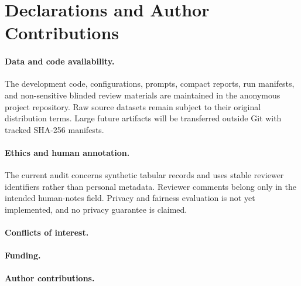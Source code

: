 \section{Declarations and Author Contributions}
\label{sec:declarations}

\paragraph{Data and code availability.}
The development code, configurations, prompts, compact reports, run manifests,
and non-sensitive blinded review materials are maintained in the anonymous
project repository. Raw source datasets remain subject to their original
distribution terms. Large future artifacts will be transferred outside Git
with tracked SHA-256 manifests.

\paragraph{Ethics and human annotation.}
The current audit concerns synthetic tabular records and uses stable reviewer
identifiers rather than personal metadata. Reviewer comments belong only in
the intended human-notes field. Privacy and fairness evaluation is not yet
implemented, and no privacy guarantee is claimed.

\paragraph{Conflicts of interest.}

\paragraph{Funding.}

\paragraph{Author contributions.}
